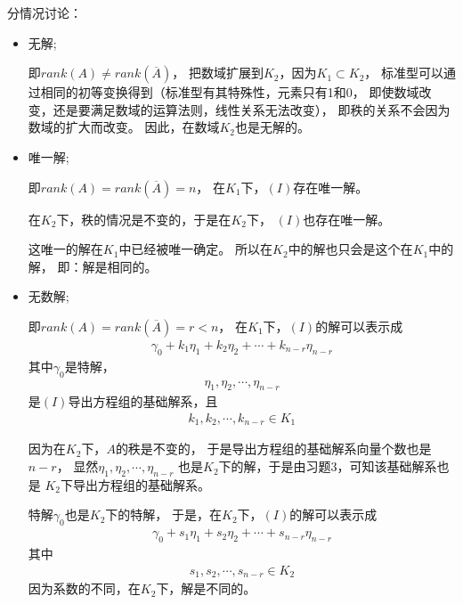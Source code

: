 \documentclass{article}
\begin{document}
分情况讨论：
\begin{itemize}
  \item 无解;

        即$rank(A) \neq rank(\overline{A})$，
        把数域扩展到$K_2$，因为$K_1 \subset K_2$，
        标准型可以通过相同的初等变换得到（标准型有其特殊性，元素只有1和0，
        即使数域改变，还是要满足数域的运算法则，线性关系无法改变），
        即秩的关系不会因为数域的扩大而改变。
        因此，在数域$K_2$也是无解的。

  \item 唯一解;

        即$rank(A) = rank(\overline{A}) = n$，
        在$K_1$下，$(I)$存在唯一解。

        在$K_2$下，秩的情况是不变的，于是在$K_2$下，
        $(I)$也存在唯一解。

        这唯一的解在$K_1$中已经被唯一确定。
        所以在$K_2$中的解也只会是这个在$K_1$中的解，
        即：解是相同的。

  \item 无数解;

        即$rank(A) = rank(\overline{A}) = r < n$，
        在$K_1$下，$(I)$的解可以表示成
        \begin{align*}
          \gamma_0 + k_1 \eta_1 + k_2 \eta_2 + \cdots + k_{n - r} \eta_{n - r}
        \end{align*}
        其中$\gamma_0$是特解，
        \begin{align*}
          \eta_1, \eta_2, \cdots, \eta_{n - r}
        \end{align*}
        是$(I)$导出方程组的基础解系，且
        \begin{align*}
          k_1, k_2, \cdots, k_{n - r} \in K_1
        \end{align*}

        因为在$K_2$下，$A$的秩是不变的，
        于是导出方程组的基础解系向量个数也是$n - r$，
        显然$\eta_1, \eta_2, \cdots, \eta_{n - r}$ 
        也是$K_2$下的解，于是由习题3，可知该基础解系也是
        $K_2$下导出方程组的基础解系。

        特解$\gamma_0$也是$K_2$下的特解，
        于是，在$K_2$下，$(I)$的解可以表示成
        \begin{align*}
          \gamma_0 + s_1 \eta_1 + s_2 \eta_2 + \cdots + s_{n - r} \eta_{n - r}
        \end{align*}
        其中
        \begin{align*}
          s_1, s_2, \cdots, s_{n - r} \in K_2
        \end{align*}
        因为系数的不同，在$K_2$下，解是不同的。
\end{itemize}
\end{document}
